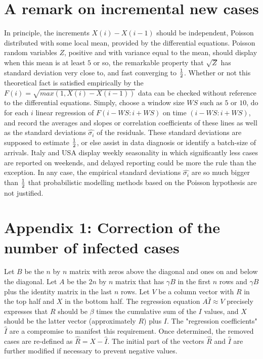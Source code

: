 \documentclass{article}
\begin{document}
\section{A remark on incremental new cases} \label{More}

In principle, the increments $X(i)-X(i-1)$ should be independent, Poisson distributed with some local mean, provided by the differential equations. Poisson random variables $Z$, positive and with variance equal to the mean, should display when this mean is at least $5$ or so, the remarkable property that $\sqrt{Z}$ has standard deviation very close to, and fast converging to ${1 \over 2}$. Whether or not this theoretical fact is satisfied empirically by the $F(i)=\sqrt{max(1,X(i)-X(i-1))}$ data can be checked without reference to the differential equations. Simply, choose a window size $WS$ such as $5$ or $10$, do for each $i$ linear regression of $F(i-WS:i+WS)$ on time $(i-WS:i+WS)$, and record the averages and slopes or correlation coefficients of these lines as well as the standard deviations $\hat{\sigma_i}$ of the residuals. These standard deviations are supposed to estimate ${1 \over 2}$, or else assist in data diagnosis or identify a batch-size of arrivals. Italy and USA display weekly seasonality in which significantly less cases are reported on weekends, and delayed reporting could be more the rule than the exception. In any case, the empirical standard deviations $\hat{\sigma_i}$ are so much bigger than ${1 \over 2}$ that probabilistic modelling methods based on the Poisson hypothesis are not justified.


\section{Appendix 1: Correction of the number of infected cases}

Let $B$ be the $n$ by $n$ matrix with zeros above the diagonal and ones on and below the diagonal. Let $A$ be the $2 n$ by $n$ matrix that has $\gamma B$ in the first $n$ rows and $\gamma B$ plus the identity matrix in the last $n$ rows. Let $V$ be a column vector with $R$ in the top half and $X$ in the bottom half. The regression equation $A \hat{I} \approx V$
precisely expresses that $R$ should be $\beta$ times the cumulative sum of the $I$ values, and $X$ should be the latter vector (approximately $R$) plus $I$. The "regression coefficients" $\hat{I}$ are a compromise to manifest this requirement. Once determined, the removed cases are re-defined as $\hat{R}=X-\hat{I}$. The initial part of the vectors $\hat{R}$ and $\hat{I}$ are further modified if necessary to prevent negative values.
\end{document}
